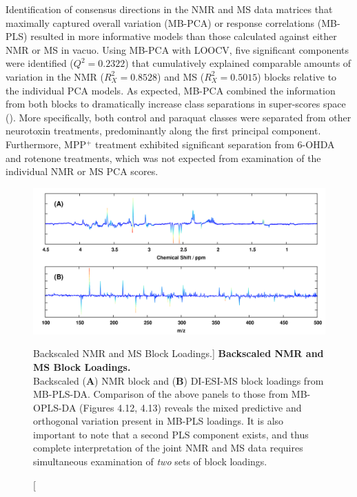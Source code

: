 \begin{doublespace}
Identification of consensus directions in the NMR and MS data matrices that
maximally captured overall variation (MB-PCA) or response correlations (MB-PLS)
resulted in more informative models than those calculated against either NMR
or MS in vacuo. Using MB-PCA with LOOCV, five significant components were
identified ($Q^2 = 0.2322$) that cumulatively explained comparable amounts
of variation in the NMR ($R^2_X = 0.8528$) and MS ($R^2_X = 0.5015$) blocks
relative to the individual PCA models. As expected, MB-PCA combined the
information from both blocks to dramatically increase class separations in
super-scores space (). More specifically, both
control and paraquat classes were separated from other neurotoxin treatments,
predominantly along the first principal component. Furthermore, MPP$^+$
treatment exhibited significant separation from 6-OHDA and rotenone
treatments, which was not expected from examination of the individual
NMR or MS PCA scores.
\end{doublespace}

\begin{figure}[ht!]
\includegraphics[width=6.5in]{figs/apps/11-mbpls-p.png}
\caption
      [Backscaled NMR and MS Block Loadings.]{
  {\bf Backscaled NMR and MS Block Loadings.}
  \\
  Backscaled ({\bf A}) \hnmr{} NMR block and ({\bf B}) DI-ESI-MS block loadings
  from MB-PLS-DA. Comparison of the above panels to those from MB-OPLS-DA
  (Figures 4.12, 4.13) reveals the mixed predictive and orthogonal variation
  present in MB-PLS loadings. It is also important to note that a second
  PLS component exists, and thus complete interpretation of the joint NMR
  and MS data requires simultaneous examination of \emph{two} sets of
  block loadings.
}
\label{figure.4.11}
\end{figure}

